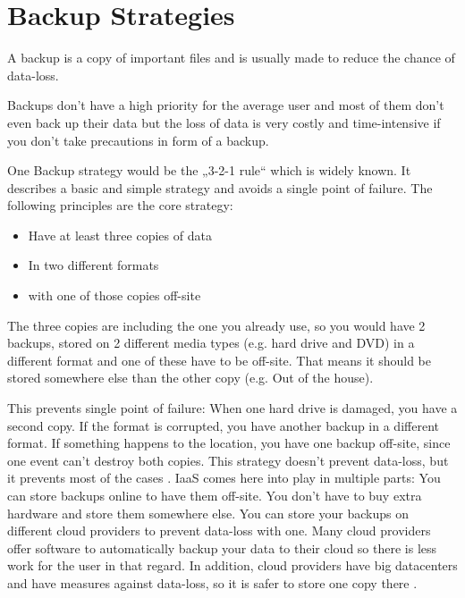 \section{Backup Strategies}
A backup is a copy of important files and is usually made to reduce the chance of data-loss.

Backups don't have a high priority for the average user and most of them don't even back up their data 
\cite{stat_backup} but the loss of data is very costly and time-intensive if you don't take precautions in form of a backup.

One Backup strategy would be the „3-2-1 rule“ which is widely known. It describes a basic and simple strategy and avoids a single point of failure.
The following principles are the core strategy:
\begin{itemize}
	\itemsep0em 
	\item Have at least three copies of data
	\item In two different formats
	\item with one of those copies off-site
\end{itemize}
The three copies are including the one you already use, so you would have 2 backups, stored on 2 different media types (e.g. hard drive and DVD) in a different format and one of these have to be off-site. That means it should be stored somewhere else than the other copy (e.g. Out of the house).

This prevents single point of failure: When one hard drive is damaged, you have a second copy. If the format is corrupted, you have another backup in a different format. If something happens to the location, you have one backup off-site, since one event can't destroy both copies.
This strategy doesn't prevent data-loss, but it prevents most of the cases \cite{micro_2013}.
IaaS comes here into play in multiple parts: You can store backups online to have them off-site. You don't have to buy extra hardware and store them somewhere else. You can store your backups on different cloud providers to prevent data-loss with one. Many cloud providers offer software to automatically backup your data to their cloud so there is less work for the user in that regard. In addition, cloud providers have big datacenters and have measures against data-loss, so it is safer to store one copy there \cite{google_centers}.


